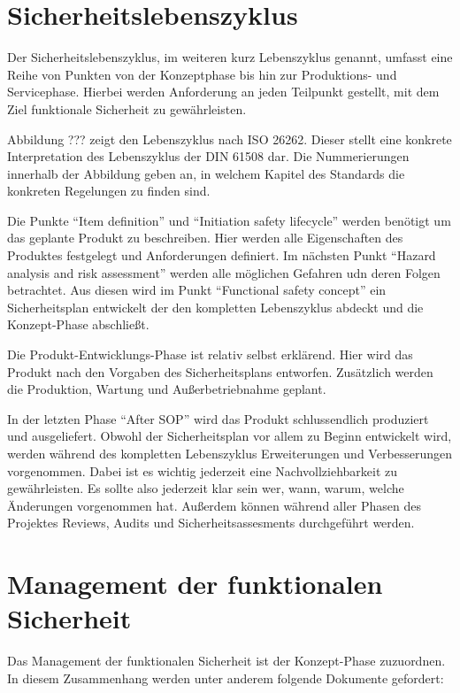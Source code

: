 \documentclass[a4paper,DIV=calc,ngerman]{scrartcl}
\begin{document}
\section{Sicherheitslebenszyklus}
\label{sec:Sicherheitslebenszyklus}
Der Sicherheitslebenszyklus, im weiteren kurz Lebenszyklus genannt, umfasst eine Reihe von Punkten von der Konzeptphase bis hin zur Produktions- und Servicephase. Hierbei werden Anforderung an jeden Teilpunkt gestellt, mit dem Ziel funktionale Sicherheit zu gewährleisten.


Abbildung ??? zeigt den Lebenszyklus nach ISO 26262. Dieser stellt eine konkrete Interpretation des Lebenszyklus der DIN 61508 dar. Die Nummerierungen innerhalb der Abbildung geben an, in welchem Kapitel des Standards die konkreten Regelungen zu finden sind. 

Die Punkte "`Item definition"' und "`Initiation safety lifecycle"' werden benötigt um das geplante Produkt zu beschreiben. Hier werden alle Eigenschaften des Produktes festgelegt und Anforderungen definiert. Im nächsten Punkt "`Hazard analysis and risk assessment"' werden alle möglichen Gefahren udn deren Folgen betrachtet. Aus diesen wird im Punkt "`Functional safety concept"' ein Sicherheitsplan entwickelt der den kompletten Lebenszyklus abdeckt und die Konzept-Phase abschließt. 

Die Produkt-Entwicklungs-Phase ist relativ selbst erklärend. Hier wird das Produkt nach den Vorgaben des Sicherheitsplans entworfen. Zusätzlich werden die Produktion, Wartung und Außerbetriebnahme geplant.

In der letzten Phase "`After SOP"' wird das Produkt schlussendlich produziert und ausgeliefert. Obwohl der Sicherheitsplan vor allem zu Beginn entwickelt wird, werden während des kompletten Lebenszyklus Erweiterungen und Verbesserungen vorgenommen. Dabei ist es wichtig jederzeit eine Nachvollziehbarkeit zu gewährleisten. Es sollte also jederzeit klar sein wer, wann, warum, welche Änderungen vorgenommen hat. Außerdem können während aller Phasen des Projektes Reviews, Audits und Sicherheitsassesments durchgeführt werden. \cite[S. 121]{1}





\section{Management der funktionalen Sicherheit}
\label{sec:Management}
Das Management der funktionalen Sicherheit ist der Konzept-Phase zuzuordnen. In diesem Zusammenhang werden unter anderem folgende Dokumente gefordert:
\end{document}
